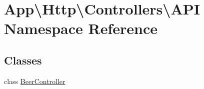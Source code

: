\hypertarget{namespace_app_1_1_http_1_1_controllers_1_1_a_p_i}{}\section{App\textbackslash{}Http\textbackslash{}Controllers\textbackslash{}A\+PI Namespace Reference}
\label{namespace_app_1_1_http_1_1_controllers_1_1_a_p_i}
\subsection*{Classes}
\begin{DoxyCompactItemize}
\item 
class \mbox{\hyperlink{class_app_1_1_http_1_1_controllers_1_1_a_p_i_1_1_beer_controller}{Beer\+Controller}}
\end{DoxyCompactItemize}
